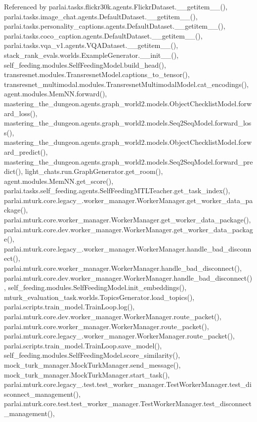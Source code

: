 Referenced by parlai.\+tasks.\+flickr30k.\+agents.\+Flickr\+Dataset.\+\_\+\+\_\+getitem\+\_\+\+\_\+(), parlai.\+tasks.\+image\+\_\+chat.\+agents.\+Default\+Dataset.\+\_\+\+\_\+getitem\+\_\+\+\_\+(), parlai.\+tasks.\+personality\+\_\+captions.\+agents.\+Default\+Dataset.\+\_\+\+\_\+getitem\+\_\+\+\_\+(), parlai.\+tasks.\+coco\+\_\+caption.\+agents.\+Default\+Dataset.\+\_\+\+\_\+getitem\+\_\+\+\_\+(), parlai.\+tasks.\+vqa\+\_\+v1.\+agents.\+V\+Q\+A\+Dataset.\+\_\+\+\_\+getitem\+\_\+\+\_\+(), stack\+\_\+rank\+\_\+evals.\+worlds.\+Example\+Generator.\+\_\+\+\_\+init\+\_\+\+\_\+(), self\+\_\+feeding.\+modules.\+Self\+Feeding\+Model.\+build\+\_\+head(), transresnet.\+modules.\+Transresnet\+Model.\+captions\+\_\+to\+\_\+tensor(), transresnet\+\_\+multimodal.\+modules.\+Transresnet\+Multimodal\+Model.\+cat\+\_\+encodings(), agent.\+modules.\+Mem\+N\+N.\+forward(), mastering\+\_\+the\+\_\+dungeon.\+agents.\+graph\+\_\+world2.\+models.\+Object\+Checklist\+Model.\+forward\+\_\+loss(), mastering\+\_\+the\+\_\+dungeon.\+agents.\+graph\+\_\+world2.\+models.\+Seq2\+Seq\+Model.\+forward\+\_\+loss(), mastering\+\_\+the\+\_\+dungeon.\+agents.\+graph\+\_\+world2.\+models.\+Object\+Checklist\+Model.\+forward\+\_\+predict(), mastering\+\_\+the\+\_\+dungeon.\+agents.\+graph\+\_\+world2.\+models.\+Seq2\+Seq\+Model.\+forward\+\_\+predict(), light\+\_\+chats.\+run.\+Graph\+Generator.\+get\+\_\+room(), agent.\+modules.\+Mem\+N\+N.\+get\+\_\+score(), parlai.\+tasks.\+self\+\_\+feeding.\+agents.\+Self\+Feeding\+M\+T\+L\+Teacher.\+get\+\_\+task\+\_\+index(), parlai.\+mturk.\+core.\+legacy\+\_.\+worker\+\_\+manager.\+Worker\+Manager.\+get\+\_\+worker\+\_\+data\+\_\+package(), parlai.\+mturk.\+core.\+worker\+\_\+manager.\+Worker\+Manager.\+get\+\_\+worker\+\_\+data\+\_\+package(), parlai.\+mturk.\+core.\+dev.\+worker\+\_\+manager.\+Worker\+Manager.\+get\+\_\+worker\+\_\+data\+\_\+package(), parlai.\+mturk.\+core.\+legacy\+\_.\+worker\+\_\+manager.\+Worker\+Manager.\+handle\+\_\+bad\+\_\+disconnect(), parlai.\+mturk.\+core.\+worker\+\_\+manager.\+Worker\+Manager.\+handle\+\_\+bad\+\_\+disconnect(), parlai.\+mturk.\+core.\+dev.\+worker\+\_\+manager.\+Worker\+Manager.\+handle\+\_\+bad\+\_\+disconnect(), self\+\_\+feeding.\+modules.\+Self\+Feeding\+Model.\+init\+\_\+embeddings(), mturk\+\_\+evaluation\+\_\+task.\+worlds.\+Topics\+Generator.\+load\+\_\+topics(), parlai.\+scripts.\+train\+\_\+model.\+Train\+Loop.\+log(), parlai.\+mturk.\+core.\+dev.\+worker\+\_\+manager.\+Worker\+Manager.\+route\+\_\+packet(), parlai.\+mturk.\+core.\+worker\+\_\+manager.\+Worker\+Manager.\+route\+\_\+packet(), parlai.\+mturk.\+core.\+legacy\+\_.\+worker\+\_\+manager.\+Worker\+Manager.\+route\+\_\+packet(), parlai.\+scripts.\+train\+\_\+model.\+Train\+Loop.\+save\+\_\+model(), self\+\_\+feeding.\+modules.\+Self\+Feeding\+Model.\+score\+\_\+similarity(), mock\+\_\+turk\+\_\+manager.\+Mock\+Turk\+Manager.\+send\+\_\+message(), mock\+\_\+turk\+\_\+manager.\+Mock\+Turk\+Manager.\+start\+\_\+task(), parlai.\+mturk.\+core.\+legacy\+\_.\+test.\+test\+\_\+worker\+\_\+manager.\+Test\+Worker\+Manager.\+test\+\_\+disconnect\+\_\+management(), parlai.\+mturk.\+core.\+test.\+test\+\_\+worker\+\_\+manager.\+Test\+Worker\+Manager.\+test\+\_\+disconnect\+\_\+management(), 